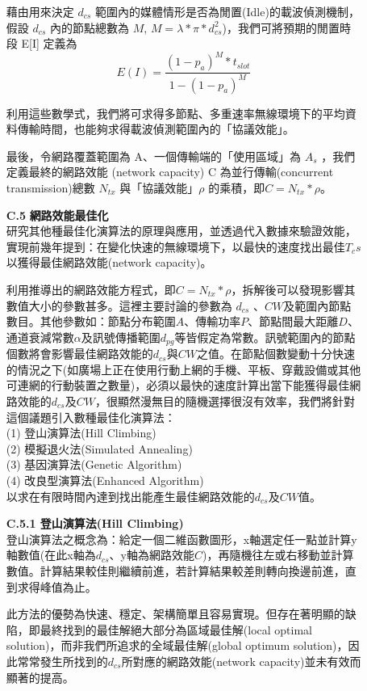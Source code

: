 \documentclass[12pt,a4paper]{article}
\begin{document}
\begin{description}
\begin{enumerate}
藉由用來決定 $d_{cs}$ 範圍內的媒體情形是否為閒置(Idle)的載波偵測機制，假設 $d_{cs}$ 內的節點總數為 $M$, $M = \lambda*\pi*d_{cs}^2$)，我們可將預期的閒置時段 E[I] 定義為
$$
E(I) =  \frac{(1-p_a)^M*t_{slot}}{1-(1-p_a)^M}
$$


利用這些數學式，我們將可求得多節點、多重速率無線環境下的平均資料傳輸時間，也能夠求得載波偵測範圍內的「協議效能」。 

最後，令網路覆蓋範圍為 A、一個傳輸端的「使用區域」為 $A_s$ ，我們定義最終的網路效能 (network capacity) C 為並行傳輸(concurrent transmission)總數 $N_{tx}$ 與「協議效能」$\rho$ 的乘積，即$C = N_{tx}*\rho$。\\


\item [\bf C.5]{\textbf{\Kai 網路效能最佳化 }}\\

研究其他種最佳化演算法的原理與應用，並透過代入數據來驗證效能，實現前幾年提到：在變化快速的無線環境下，以最快的速度找出最佳$T_cs$以獲得最佳網路效能(network capacity)。

利用推導出的網路效能方程式，即$C = N_{tx}*\rho$，拆解後可以發現影響其數值大小的參數甚多。這裡主要討論的參數為 $d_{cs}$ 、$CW$及範圍內節點數目。其他參數如：節點分布範圍$A$、傳輸功率$P$、節點間最大距離$D$、通道衰減常數$\alpha$及訊號傳播範圍$d_{pg}$等皆假定為常數。訊號範圍內的節點個數將會影響最佳網路效能的$d_{cs}$與$CW$之值。在節點個數變動十分快速的情況之下(如廣場上正在使用行動上網的手機、平板、穿戴設備或其他可連網的行動裝置之數量)，必須以最快的速度計算出當下能獲得最佳網路效能的$d_{cs}$及$CW$，很顯然漫無目的隨機選擇很沒有效率，我們將針對這個議題引入數種最佳化演算法：\\
(1) 登山演算法(Hill Climbing)\\
(2) 模擬退火法(Simulated Annealing) \\
(3) 基因演算法(Genetic Algorithm) \\
(4) 改良型演算法(Enhanced Algorithm)\\
以求在有限時間內達到找出能產生最佳網路效能的$d_{cs}$及$CW$值。\\

\item [\bf ]{\textbf{\Kai C.5.1 登山演算法(Hill Climbing) }}\\

登山演算法之概念為：給定一個二維函數圖形，x軸選定任一點並計算y軸數值(在此x軸為$d_{cs}$、y軸為網路效能$C$)，再隨機往左或右移動並計算數值。計算結果較佳則繼續前進，若計算結果較差則轉向換邊前進，直到求得峰值為止。

此方法的優勢為快速、穩定、架構簡單且容易實現。但存在著明顯的缺陷，即最終找到的最佳解絕大部分為區域最佳解(local optimal solution)，而非我們所追求的全域最佳解(global optimum solution)，因此常常發生所找到的$d_{cs}$所對應的網路效能(network capacity)並未有效而顯著的提高。\\



\end{enumerate}
\end{description}
\end{document}
